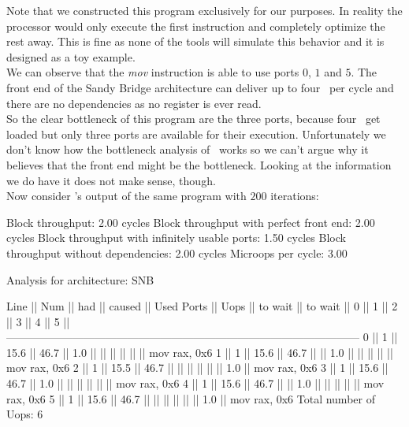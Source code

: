 Note that we constructed this program exclusively for our purposes. In reality the processor would only execute the first instruction and completely optimize the rest away. This is fine as none of the tools will simulate this behavior and it is designed as a toy example.\\
We can observe that the \emph{mov} instruction is able to use ports $0$, $1$ and $5$. The front end of the Sandy Bridge architecture can deliver up to four \microops\ per cycle and there are no dependencies as no register is ever read.\\
So the clear bottleneck of this program are the three ports, because four \microops\ get loaded but only three ports are available for their execution. Unfortunately we don't know how the bottleneck analysis of \iaca\ works so we can't argue why it believes that the front end might be the bottleneck. Looking at the information we do have it does not make sense, though.\\


Now consider \suaca's output of the same program with $200$ iterations:

\begin{example}
Block throughput: 2.00 cycles
Block throughput with perfect front end: 2.00 cycles
Block throughput with infinitely usable ports: 1.50 cycles
Block throughput without dependencies: 2.00 cycles
Microops per cycle: 3.00
       
Analysis for architecture: SNB
        
 Line  ||   Num   ||   had   || caused  ||            Used Ports
       ||   Uops  || to wait || to wait ||   0   ||   1   ||   2   ||   3   ||   4   ||   5   ||
 ------------------------------------------------------------------------------------------------
   0   ||    1    ||  15.6   ||  46.7   ||  1.0  ||       ||       ||       ||       ||       || mov rax, 0x6
   1   ||    1    ||  15.6   ||  46.7   ||       ||  1.0  ||       ||       ||       ||       || mov rax, 0x6
   2   ||    1    ||  15.5   ||  46.7   ||       ||       ||       ||       ||       ||  1.0  || mov rax, 0x6
   3   ||    1    ||  15.6   ||  46.7   ||  1.0  ||       ||       ||       ||       ||       || mov rax, 0x6
   4   ||    1    ||  15.6   ||  46.7   ||       ||  1.0  ||       ||       ||       ||       || mov rax, 0x6
   5   ||    1    ||  15.6   ||  46.7   ||       ||       ||       ||       ||       ||  1.0  || mov rax, 0x6
Total number of Uops: 6
\end{example}

